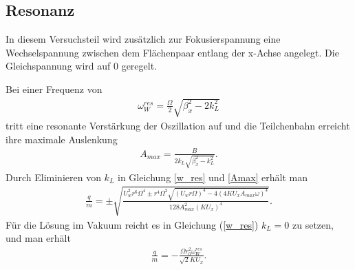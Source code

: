 \documentclass[a4paper,12pt]{article}
\begin{document}
\subsection{Resonanz}
In diesem Versuchsteil wird zusätzlich zur Fokusierspannung eine Wechselspannung zwischen dem Flächenpaar entlang der x-Achse angelegt.
Die Gleichspannung wird auf $0$ geregelt.

Bei einer Frequenz von
\begin{align}\label{w_res}
	\omega^{res}_W = \frac{\Omega}{2}\sqrt{\beta^{2}_x-2k^{2}_L}
\end{align}
tritt eine resonante Verstärkung der Oszillation auf und die Teilchenbahn erreicht ihre maximale Auslenkung
\begin{align}\label{Amax}
	A_{max} = \frac{B}{2k_L\sqrt{\beta^{2}_x-k^{2}_L}}.
\end{align}
Durch Eliminieren von $k_L$ in Gleichung \ref{w_res} und \ref{Amax} erhält man
\begin{align}\label{res_luft}
	\frac{q}{m} = ±\sqrt{
		\frac{
			U_w^2r^6Ω^4 ± r^4Ω^2\sqrt{
				(U_wrΩ)^4 - 4(4KU_xA_{max}ω)^4
			} %
		}{
			128A_{max}^2(KU_x)^4
		} %
	}. %
\end{align}
Für die Lösung im Vakuum reicht es in Gleichung (\ref{w_res}) $k_L=0$ zu setzen, und man erhält
\begin{align}\label{res_vak}
	\frac{q}{m} = -\frac{\Omega r^{2}_0 \omega^{res}_W}{\sqrt{2} K U_x}.
\end{align}
\end{document}
